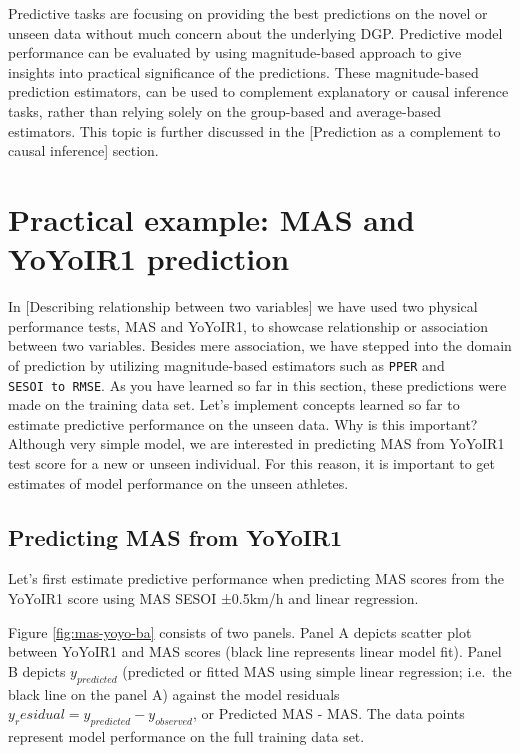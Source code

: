 \documentclass[
]{book}
\begin{document}
Predictive tasks are focusing on providing the best predictions on the novel or unseen data without much concern about the underlying DGP. Predictive model performance can be evaluated by using magnitude-based approach to give insights into practical significance of the predictions. These magnitude-based prediction estimators, can be used to complement explanatory or causal inference tasks, rather than relying solely on the group-based and average-based estimators. This topic is further discussed in the {[}Prediction as a complement to causal inference{]} section.

\hypertarget{practical-example-mas-and-yoyoir1-prediction}{%
\section{Practical example: MAS and YoYoIR1 prediction}\label{practical-example-mas-and-yoyoir1-prediction}}

In {[}Describing relationship between two variables{]} we have used two physical performance tests, MAS and YoYoIR1, to showcase relationship or association between two variables. Besides mere association, we have stepped into the domain of prediction by utilizing magnitude-based estimators such as \texttt{PPER} and \texttt{SESOI\ to\ RMSE}. As you have learned so far in this section, these predictions were made on the training data set. Let's implement concepts learned so far to estimate predictive performance on the unseen data. Why is this important? Although very simple model, we are interested in predicting MAS from YoYoIR1 test score for a new or unseen individual. For this reason, it is important to get estimates of model performance on the unseen athletes.

\hypertarget{predicting-mas-from-yoyoir1}{%
\subsection{Predicting MAS from YoYoIR1}\label{predicting-mas-from-yoyoir1}}

Let's first estimate predictive performance when predicting MAS scores from the YoYoIR1 score using MAS SESOI ±0.5km/h and linear regression.

Figure \ref{fig:mas-yoyo-ba} consists of two panels. Panel A depicts scatter plot between YoYoIR1 and MAS scores (black line represents linear model fit). Panel B depicts \(y_{predicted}\) (predicted or fitted MAS using simple linear regression; i.e.~the black line on the panel A) against the model residuals \(y_residual = y_{predicted} - y_{observed}\), or Predicted MAS - MAS. The data points represent model performance on the full training data set.
\end{document}
